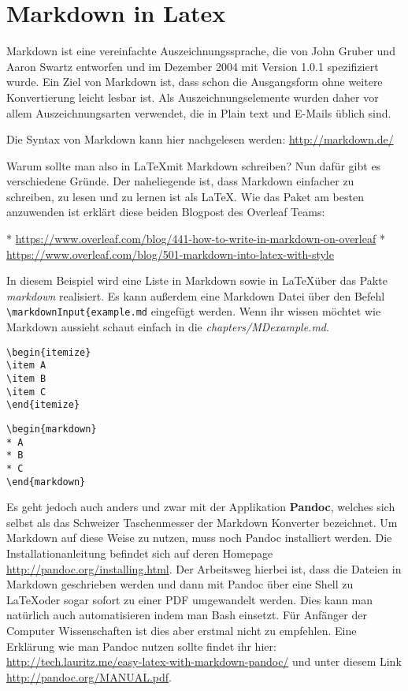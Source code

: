 \chapter{Markdown in Latex}

Markdown ist eine vereinfachte Auszeichnungssprache, die von John Gruber und Aaron Swartz entworfen und im Dezember 2004 mit Version 1.0.1 spezifiziert wurde. Ein Ziel von Markdown ist, dass schon die Ausgangsform ohne weitere Konvertierung leicht lesbar ist. Als Auszeichnungselemente wurden daher vor allem Auszeichnungsarten verwendet, die in Plain text und E-Mails üblich sind. \cite{WikiMarkdown,rfc7763}

Die Syntax von Markdown kann hier nachgelesen werden: \url{http://markdown.de/}

Warum sollte man also in \LaTeX mit Markdown schreiben? Nun dafür gibt es verschiedene Gründe. Der naheliegende ist, dass Markdown einfacher zu schreiben, zu lesen und zu lernen ist als \LaTeX.  Wie das Paket am besten anzuwenden ist erklärt diese beiden Blogpost des Overleaf Teams:

\begin{markdown}
 * \url{https://www.overleaf.com/blog/441-how-to-write-in-markdown-on-overleaf}
 * \url{https://www.overleaf.com/blog/501-markdown-into-latex-with-style} 
\end{markdown}

In diesem Beispiel wird eine Liste in Markdown sowie in \LaTeX über das Pakte \emph{markdown} realisiert. Es kann außerdem eine Markdown Datei über den Befehl \verb|\markdownInput{example.md| eingefügt werden. Wenn ihr wissen möchtet wie Markdown aussieht schaut einfach in die \emph{chapters/MDexample.md}.
\begin{lstlisting}[style=LaTeX]
\begin{itemize}
\item A
\item B
\item C
\end{itemize}
\end{lstlisting}

\begin{lstlisting}[style=LaTeX]
\begin{markdown}
* A
* B
* C
\end{markdown}
\end{lstlisting}


Es geht jedoch auch anders und zwar mit der Applikation \textbf{Pandoc}, welches sich selbst als das Schweizer Taschenmesser der Markdown Konverter bezeichnet. Um Markdown auf diese Weise zu nutzen, muss noch Pandoc installiert werden. Die Installationanleitung befindet sich auf deren Homepage \url{http://pandoc.org/installing.html}. Der Arbeitsweg hierbei ist, dass die Dateien in Markdown geschrieben werden und dann mit Pandoc über eine Shell zu \LaTeX oder sogar sofort zu einer PDF umgewandelt werden. Dies kann man natürlich auch automatisieren indem man Bash einsetzt. Für Anfänger der Computer Wissenschaften ist dies aber erstmal nicht zu empfehlen. Eine Erklärung wie man Pandoc nutzen sollte findet ihr hier: \url{http://tech.lauritz.me/easy-latex-with-markdown-pandoc/} und unter diesem Link \url{http://pandoc.org/MANUAL.pdf}.  


